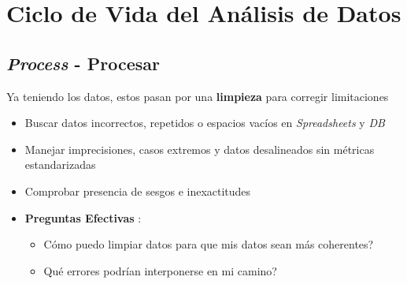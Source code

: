 \section{Ciclo de Vida del Análisis de Datos}

\subsection{\textit{Process} - Procesar}
Ya teniendo los datos, estos pasan por una \textbf{limpieza} para corregir limitaciones
\begin{itemize}
    \item {Buscar datos incorrectos, repetidos o espacios vacíos en \textit{Spreadsheets} y \textit{DB}}
    \item {Manejar imprecisiones, casos extremos y datos desalineados sin métricas estandarizadas}
    \item {Comprobar presencia de sesgos e inexactitudes}
    \item {\textbf{Preguntas Efectivas} :
    \begin{itemize}
        \item {Cómo puedo limpiar datos para que mis datos sean más coherentes?}
        \item {Qué errores podrían interponerse en mi camino?}
    \end{itemize}}
\end{itemize}

